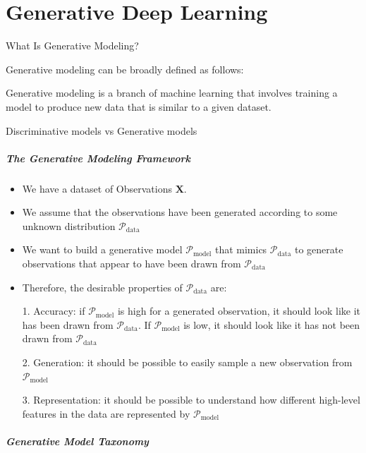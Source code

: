 \chapter{Generative Deep Learning}\label{chp:generative_deep_learning}

\textcite{foster2022generative}

What Is Generative Modeling?

Generative modeling can be broadly defined as follows:

Generative modeling is a branch of machine learning that involves training a model to produce new data that is similar to a given dataset.


Discriminative models vs Generative models

\paragraph{The Generative Modeling Framework}

\begin{itemize}
	\item We have a dataset of Observations $\mathbf{X}$.
	\item We assume that the observations have been generated according to some unknown distribution \(\mathcal{P}_{\textrm{data}}\)
	\item We want to build a generative model \(\mathcal{P}_{\textrm{model}}\) that mimics \(\mathcal{P}_{\textrm{data}}\) to generate observations that appear to have been drawn from \(\mathcal{P}_{\textrm{data}}\)
	\item Therefore, the desirable properties of \(\mathcal{P}_{\textrm{data}}\) are:

	      1. Accuracy: if \(\mathcal{P}_{\textrm{model}}\)  is high for a generated observation, it should look like it has been drawn from \(\mathcal{P}_{\textrm{data}}\). If \(\mathcal{P}_{\textrm{model}}\) is low, it should look like it has not been drawn from \(\mathcal{P}_{\textrm{data}}\)

	      2. Generation: it should be possible  to easily sample a new observation from \(\mathcal{P}_{\textrm{model}}\)

	      3. Representation:  it should be possible to understand how different high-level features in the data are represented by \(\mathcal{P}_{\textrm{model}}\)
\end{itemize}


\paragraph{Generative Model Taxonomy}



